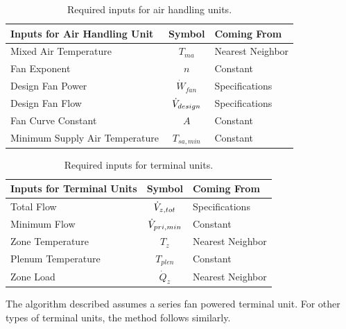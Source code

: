 \begin{table}
\centering
\caption{Required inputs for air handling units.}
\label{tab:RequiredInputsForAHUs}
\begin{tabular}{lcl}\toprule
    Inputs for Air Handling Unit   & Symbol            & Coming From      \\ \midrule
    Mixed Air Temperature          & \(T_{ma}\)        & Nearest Neighbor \\
    Fan Exponent                   & \(n\)             & Constant         \\
    Design Fan Power               & \(\dot{W}_{fan}\) & Specifications   \\
    Design Fan Flow                & \(\dot{V}_{design}\) & Specifications   \\
    Fan Curve Constant             & \(A\)             & Constant         \\
    Minimum Supply Air Temperature & \(T_{sa,min}\)    & Constant         \\ \bottomrule
\end{tabular}
\end{table}

\begin{table}
\centering
\caption{Required inputs for terminal units.}
\label{tab:RequiredInputsForTerminalUnits}
\begin{tabular}{lcl}\toprule
    Inputs for Terminal Units & Symbol             & Coming From      \\ \midrule
    Total Flow                & \(\dot{V}_{z,tot}\) & Specifications   \\
     Minimum Flow             & \(\dot{V}_{pri,min}\) & Constant         \\
     Zone Temperature         & \(T_{z}\)          & Nearest Neighbor \\
     Plenum Temperature       & \(T_{plen}\)       & Constant         \\
     Zone Load                & \(\dot{Q}_{z}\)    & Nearest Neighbor \\ \bottomrule
\end{tabular}
\end{table}


The algorithm described assumes a series fan powered terminal unit. For
other types of terminal units, the method follows similarly. 

